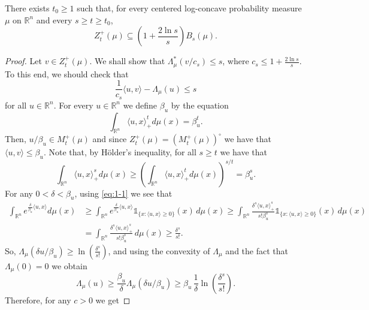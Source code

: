\documentclass[10pt,a4paper]{amsart}
\newcommand{\gr}{\geqslant}
\newcommand{\ls}{\leqslant}
\begin{document}
\begin{proposition}\label{prop:1}There exists $t_0\gr 1$ such that, for every centered log-concave probability measure $\mu $ on ${\mathbb R}^n$ and 
every $s\gr t\gr t_0$,
\begin{equation*}Z_t^+(\mu) \subseteq \left(1+\frac{2\ln s}{s}\right)B_s(\mu).\end{equation*}
\end{proposition}

\begin{proof}Let $v\in Z_t^+(\mu)$. We shall show that $\Lambda^{\ast }_{\mu }(v/c_s)\ls s$, where
$c_s\ls 1+\frac{2\ln s}{s}$. To this end, we should check that
\begin{equation*}\frac{1}{c_s}\langle u, v\rangle-\Lambda_\mu(u) \ls s\end{equation*}
for all $u\in{\mathbb R}^n$. For every $u\in{\mathbb R}^n$ we define $\beta_u$ by the equation
\begin{equation*}\int_{{\mathbb R}^n}\langle u, x\rangle_+^td\mu(x) = \beta_u^t.\end{equation*}
Then, $u/\beta_u\in M^+_t(\mu)$ and since $Z_t^+(\mu )=(M_t^+(\mu ))^{\circ }$
we have that $\langle u,v\rangle \ls \beta_u$. Note that, by H\"{o}lder's inequality, for all $s\gr t$ we have that
\begin{equation}\label{eq:1-1}\int_{{\mathbb R}^n}\langle u, x\rangle_+^sd\mu(x)\gr \left(\int_{{\mathbb R}^n}\langle u, x\rangle_+^td\mu(x)\right)^{s/t}=\beta_u^s.\end{equation}
For any $0<\delta<\beta_u$, using \eqref{eq:1-1} we see that
\begin{align*}\int_{{\mathbb R}^n} e^{\frac{\delta}{\beta_u}\langle u,x\rangle }d\mu(x) &\gr  \int_{{\mathbb R}^n} e^{\frac{\delta}{\beta_u}\langle
u,x\rangle}\mathds{1}_{\{x:\langle u,x\rangle \gr 0\}}(x)\,d\mu(x)
\gr \int_{{\mathbb R}^n} \frac{\delta^s\langle u, x\rangle_+^s}{s!\beta_u^s} \mathds{1}_{\{x:\langle
u,x\rangle \gr 0\}}(x)\,d\mu(x) \\
&=\int_{{\mathbb R}^n} \frac{\delta^s\langle u, x\rangle_+^s}{s!\beta_u^s}\,d\mu(x)
\gr\frac{\delta^s}{s!}.\end{align*}
So, $\Lambda_{\mu}(\delta u/\beta_u)\gr \ln\left(\frac{\delta^s}{s!}\right)$, and using the convexity of $\Lambda_{\mu}$
and the fact that $\Lambda_{\mu}(0)=0$ we obtain
\begin{equation*}\Lambda_{\mu}(u) \gr \frac{\beta_u}{\delta}\Lambda_{\mu}(\delta u/\beta_u)
\gr \beta_u\,\frac{1}{\delta}\ln\left(\frac{\delta^s}{s!}\right).\end{equation*} Therefore, for any $c>0$ we get

\end{proof}
\end{document}
